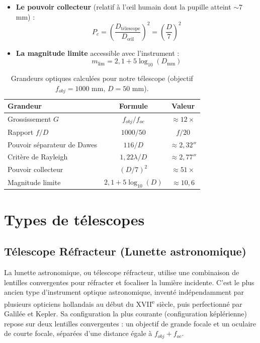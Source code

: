 \documentclass[12pt,a4paper]{report}
\begin{document}
\begin{itemize}
\begin{equation}
        \theta_{\text{Rayleigh}} = 1{,}22 \frac{\lambda}{D}
    \end{equation}
    où $\lambda$ est la longueur d'onde de la lumière (typiquement $550$ nm pour le visible).
    \item \textbf{Le pouvoir collecteur} (relatif à l'œil humain dont la pupille atteint $\sim 7$ mm) :
    \begin{equation}
        P_c = \left(\frac{D_{\text{télescope}}}{D_{\text{œil}}}\right)^2 = \left(\frac{D}{7}\right)^2
    \end{equation}
    \item \textbf{La magnitude limite} accessible avec l'instrument :
    \begin{equation}
        m_{\text{lim}} = 2{,}1 + 5 \log_{10}(D_{\text{mm}})
    \end{equation}
\end{itemize}

\begin{table}[H]
    \centering
    \caption{Grandeurs optiques calculées pour notre télescope (objectif $f_{obj} = 1000$ mm, $D = 50$ mm).}
    \begin{tabular}{|l|c|c|}
        \hline
        \textbf{Grandeur} & \textbf{Formule} & \textbf{Valeur} \\
        \hline
        Grossissement $G$ & $f_{obj}/f_{oc}$ & $\approx 12 \times$ \\
        Rapport $f/D$ & $1000/50$ & $f/20$ \\
        Pouvoir séparateur de Dawes & $116/D$ & $\approx 2{,}32''$ \\
        Critère de Rayleigh & $1{,}22 \lambda /D$ & $\approx 2{,}77''$ \\
        Pouvoir collecteur & $(D/7)^2$ & $\approx 51 \times$ \\
        Magnitude limite & $2{,}1 + 5\log_{10}(D)$ & $\approx 10{,}6$ \\
        \hline
    \end{tabular}
    \label{tab:grandeurs_optiques}
\end{table}

\section{Types de télescopes}
\subsection{Télescope Réfracteur (Lunette astronomique)}
La lunette astronomique, ou télescope réfracteur, utilise une combinaison de lentilles convergentes pour réfracter et focaliser la lumière incidente. C'est le plus ancien type d'instrument optique astronomique, inventé indépendamment par plusieurs opticiens hollandais au début du XVII\textsuperscript{e} siècle, puis perfectionné par Galilée et Kepler. Sa configuration la plus courante (configuration képlérienne) repose sur deux lentilles convergentes : un objectif de grande focale et un oculaire de courte focale, séparées d'une distance égale à $f_{obj} + f_{oc}$.
\end{document}
